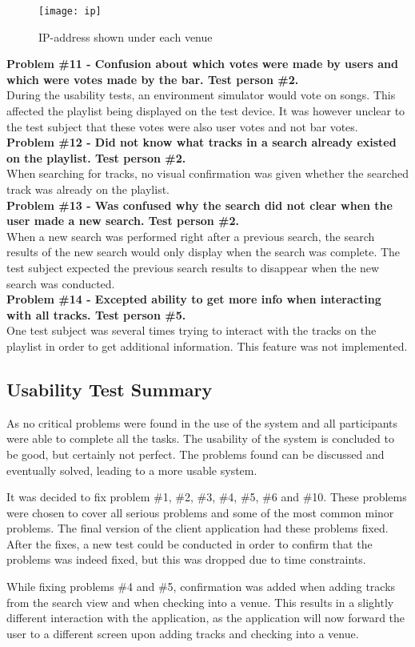 \begin{figure}[hbtp]
  \centering
  \texttt{[image: ip]}
  \caption{IP-address shown under each venue}\label{fig:ip}
\end{figure}

\noindent\textbf{Problem \#11 - Confusion about which votes were made by users and which were
    votes made by the bar. Test person \#2.}\\
  During the usability tests, an environment simulator would vote on
  songs. This affected the playlist being displayed on the test
  device. It was however unclear to the test subject that these votes
  were also user votes and not bar votes.\\

\noindent\textbf{Problem \#12 - Did not know what tracks in a search already existed on the
    playlist. Test person \#2.}\\
  When searching for tracks, no visual confirmation was given whether
  the searched track was already on the playlist.\\

\noindent\textbf{Problem \#13 - Was confused why the search did not
  clear when the user made a new search. Test person \#2.}\\
  When a new search was performed right after a previous search, the
  search results of the new search would only display when the search
  was complete. The test subject expected the previous search results
  to disappear when the new search was conducted.\\

\noindent\textbf{Problem \#14 - Excepted ability to get more info when interacting with all
    tracks. Test person \#5.}\\
  One test subject was several times trying to interact with the
  tracks on the playlist in order to get additional information. This
  feature was not implemented.

\subsection{Usability Test Summary}
As no critical problems were found in the use of the system and all participants were able to complete all the tasks. The usability of the system is concluded to be good, but certainly not perfect. The problems found can be discussed and eventually solved, leading to a more usable system.

It was decided to fix problem \#1, \#2, \#3, \#4, \#5, \#6 and
\#10. These problems were chosen to cover all serious problems and
some of the most common minor problems. The final version of the
client application had these problems fixed. After the fixes, a new test
could be conducted in order to confirm that the problems was indeed
fixed, but this was dropped due to time constraints.

While fixing problems \#4 and \#5, confirmation was added when adding
tracks from the search view and when checking into a venue. This results in a slightly different
interaction with the application, as the application will now forward
the user to a different screen upon adding tracks and checking into a venue.
